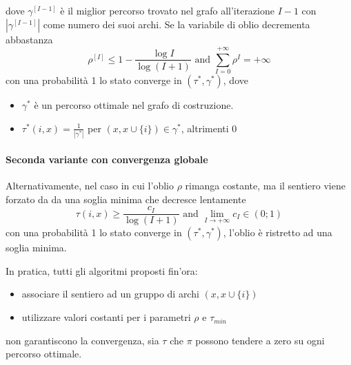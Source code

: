 \documentclass{article}
\begin{document}
dove $\gamma^{[I-1]}$ è il miglior percorso trovato nel grafo all'iterazione $I-1$ con
$|\gamma^{[I-1]}|$ come numero dei suoi archi. Se la variabile di oblio decrementa
abbastanza
$$\rho^{[I]}\leq 1-\frac{\log I}{\log (I+1)}\text{ and }\sum_{I=0}^{+\infty}\rho^{I}=+\infty$$
con una probabilità 1 lo stato converge in $(\tau^*,\gamma^*)$, dove
\begin{itemize}
    \item $\gamma^*$ è un percorso ottimale nel grafo di costruzione.
    \item $\tau^*(i,x)=\frac{1}{|\gamma^*|}$ per $(x,x\cup\{i\})\in\gamma^*$, altrimenti 0
\end{itemize}

\paragraph{Seconda variante con convergenza globale}
Alternativamente, nel caso in cui l'oblio $\rho$ rimanga costante, ma il sentiero viene forzato da
da una soglia minima che decresce lentamente
$$\tau(i,x)\geq\frac{c_I}{\log (I+1)}\text{ and }\lim_{I\rightarrow +\infty}c_I\in (0;1)$$
con una probabilità 1 lo stato converge in $(\tau^*,\gamma^*)$, l'oblio è ristretto
ad una soglia minima.

In pratica, tutti gli algoritmi proposti fin'ora:
\begin{itemize}
    \item associare il sentiero ad un gruppo di archi $(x,x\cup\{i\})$
    \item utilizzare valori costanti per i parametri $\rho$ e $\tau_{min}$
\end{itemize}

non garantiscono la convergenza, sia $\tau$ che $\pi$ possono tendere a zero su
ogni percorso ottimale.
\end{document}
